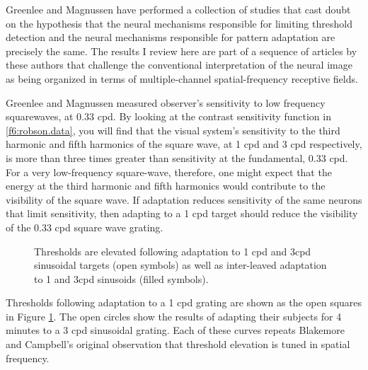 \nocite{GreenleeMagnussen}
Greenlee and Magnussen have performed a collection of studies
that cast doubt on the hypothesis that the neural mechanisms
responsible for limiting threshold detection and
the neural mechanisms responsible for pattern
adaptation are precisely the same.
The results I review here are part of a sequence
of articles by these authors that challenge 
the conventional interpretation of the neural image as being organized
in terms of multiple-channel spatial-frequency receptive fields.

Greenlee and Magnussen measured observer's
sensitivity to low frequency squarewaves, at 0.33 cpd.
By looking at the contrast sensitivity function in
\ref{f6:robson.data}, you will find that
the visual system's sensitivity to the third harmonic and
fifth harmonics of the square wave, at 1 cpd and 3 cpd respectively,
is more than three times greater than sensitivity
at the fundamental, 0.33 cpd.
For a very low-frequency square-wave, therefore, one
might expect that the energy at the third harmonic and fifth harmonics
would contribute to the visibility of the square wave.
If adaptation reduces sensitivity of the same
neurons that limit sensitivity,
then adapting to a 1 cpd target should reduce the visibility
of the 0.33 cpd square wave grating.

\begin{figure}
\centerline{
}
\caption[Adpatation to Low Frequencies]{
Thresholds are elevated following adaptation to 1 cpd and 3cpd
sinusoidal targets
(open symbols) as well as inter-leaved adaptation to 1 and 3cpd
sinusoids (filled symbols).
}
\label{f6:GM.Fig2}
\end{figure}
Thresholds following adaptation to a 1 cpd grating are shown
as the open squares in Figure \ref{f6:GM.Fig2}.
The open circles show the results of adapting their subjects
for 4 minutes to a 3 cpd sinusoidal grating.
Each of these curves repeats Blakemore and Campbell's original
observation that threshold elevation is tuned in
spatial frequency.

